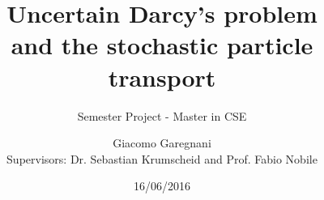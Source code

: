 \documentclass{beamer}
\title{Uncertain Darcy's problem \\ and the stochastic particle transport}
\subtitle{Semester Project - Master in CSE}
\author{Giacomo Garegnani \\ {Supervisors: Dr. Sebastian Krumscheid and Prof. Fabio Nobile}}
\institute{EPFL}
\date{16/06/2016}
\begin{document}
\frame{\titlepage}






	
\end{document}

